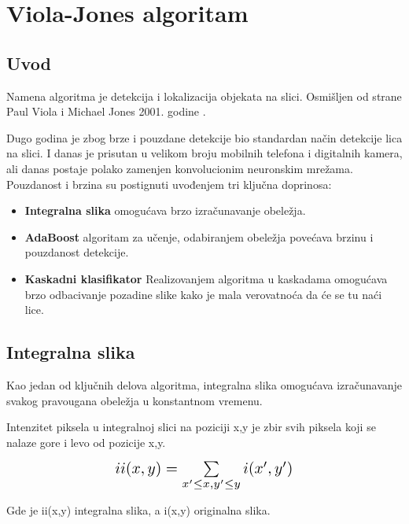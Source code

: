 \section{Viola-Jones algoritam}

\subsection{Uvod}

Namena algoritma je detekcija i lokalizacija objekata na slici. Osmišljen od
strane Paul Viola i Michael Jones 2001. godine \cite{Viola2001RapidOD}.

Dugo godina je zbog brze i pouzdane detekcije bio standardan način detekcije
lica na slici. I danas je prisutan u velikom broju mobilnih telefona i
digitalnih kamera, ali danas postaje polako zamenjen konvolucionim neuronskim
mrežama. \\

Pouzdanost i brzina su postignuti uvođenjem tri ključna doprinosa:
\begin{itemize}

\item \textbf{Integralna slika} omogućava brzo izračunavanje obeležja.
\item \textbf{AdaBoost} algoritam za učenje, odabiranjem obeležja povećava
  brzinu i pouzdanost detekcije.
\item \textbf{Kaskadni klasifikator} Realizovanjem algoritma u kaskadama
  omogućava brzo odbacivanje pozadine slike kako je mala verovatnoća da će se tu
  naći lice. \\
\end{itemize}


\subsection{Integralna slika}

Kao jedan od ključnih delova algoritma, integralna slika omogućava izračunavanje
svakog pravougana obeležja u konstantnom vremenu.

Intenzitet piksela u integralnoj slici na poziciji x,y je zbir svih piksela koji
se nalaze gore i levo od pozicije x,y.

\begin{equation}
  \Scale[1.4]{ii(x,y)=\sum\limits_{x'\leq x, y'\leq y} i(x',y')}
  \label{IntegralImage_eq1}
\end{equation}

Gde je ii(x,y) integralna slika, a i(x,y) originalna slika. \\

